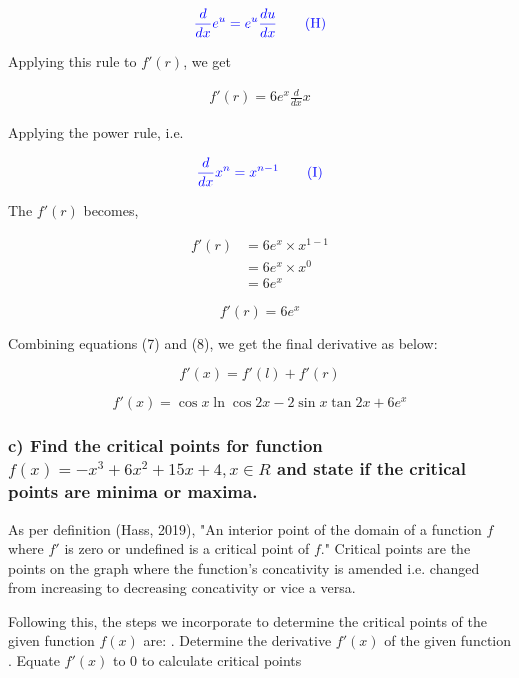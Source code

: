 \documentclass[a4paper]{report}
\begin{document}
\begin{equation*}
    \color{blue} \frac{d}{dx}e^u = e^u \frac{du}{dx} \tag{H}
\end{equation*}

Applying this rule to $f'(r)$, we get

\begin{align*}
    f'(r)=6e^x\frac{d}{dx}x
\end{align*}

Applying the power rule, i.e.

\begin{equation*}
    \color{blue} \frac{d}{dx}{x^n} = x^{n-1} \tag{I}
\end{equation*}

The $f'(r)$ becomes,

\begin{align*}
    f'(r) &= 6e^x\times x^{1-1} \\
          &= 6e^x\times x^{0} \\
          &= 6e^x
\end{align*}

\begin{equation}
    f'(r)= 6e^x
\end{equation}


Combining  equations (7) and (8), we get the final derivative as below:


$$f'(x)=f'(l)+f'(r)$$



\begin{equation*}
    \boxed{f'(x)= \cos x\ln \cos 2x-2\sin x \tan 2x +6e^x}
\end{equation*}


\subsubsection*{c)  Find the critical points for function $f(x)=-x^3+6x^2+15x+4, x\in {R}$ and state if the critical points are minima or maxima.}


As per definition (Hass, 2019), "An interior point of the domain of a function $f$ where $f'$ is zero or undefined is a critical point of $f$." Critical points are the points on the graph where the function's concativity is amended i.e. changed from increasing to decreasing concativity or vice a versa. 

Following this, the steps we incorporate to determine the critical points of the given function $f(x)$ are: . Determine the derivative $f'(x)$ of the given function
. Equate $f'(x)$ to $0$ to calculate critical points
\end{document}
